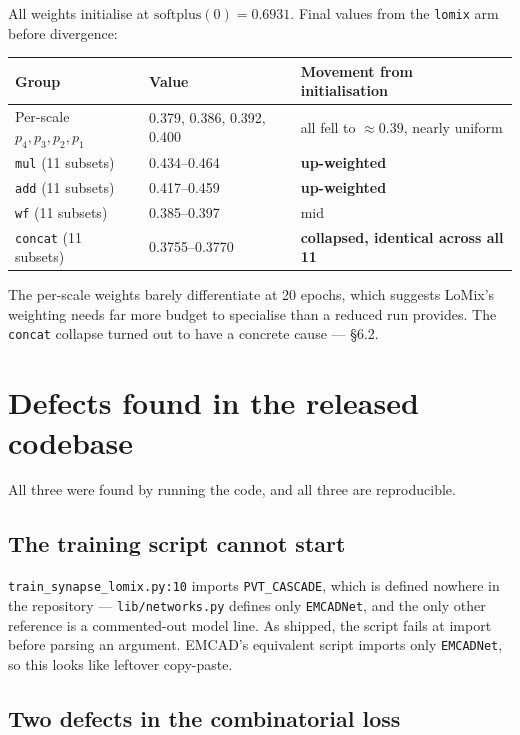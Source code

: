\documentclass[11pt,a4paper]{article}
\newcommand{\code}[1]{\texttt{\small #1}}
\begin{document}
All weights initialise at $\mathrm{softplus}(0) = 0.6931$. Final values from the
\code{lomix} arm before divergence:

\begin{center}
\begin{tabular}{@{}llp{7.2cm}@{}}
\toprule
\textbf{Group} & \textbf{Value} & \textbf{Movement from initialisation} \\
\midrule
Per-scale $p_4,p_3,p_2,p_1$ & 0.379, 0.386, 0.392, 0.400 & all fell to ${\approx}0.39$, nearly uniform \\
\code{mul} (11 subsets) & 0.434--0.464 & \textbf{up-weighted} \\
\code{add} (11 subsets) & 0.417--0.459 & \textbf{up-weighted} \\
\code{wf} (11 subsets) & 0.385--0.397 & mid \\
\code{concat} (11 subsets) & 0.3755--0.3770 & \textbf{collapsed, identical across all 11} \\
\bottomrule
\end{tabular}
\end{center}

The per-scale weights barely differentiate at 20 epochs, which suggests LoMix's
weighting needs far more budget to specialise than a reduced run provides. The
\code{concat} collapse turned out to have a concrete cause --- \S6.2.

\section{Defects found in the released codebase}

All three were found by running the code, and all three are reproducible.

\subsection{The training script cannot start}

\code{train\_synapse\_lomix.py:10} imports \code{PVT\_CASCADE}, which is defined
nowhere in the repository --- \code{lib/networks.py} defines only
\code{EMCADNet}, and the only other reference is a commented-out model line. As
shipped, the script fails at import before parsing an argument. EMCAD's
equivalent script imports only \code{EMCADNet}, so this looks like leftover
copy-paste.

\subsection{Two defects in the combinatorial loss}
\end{document}
